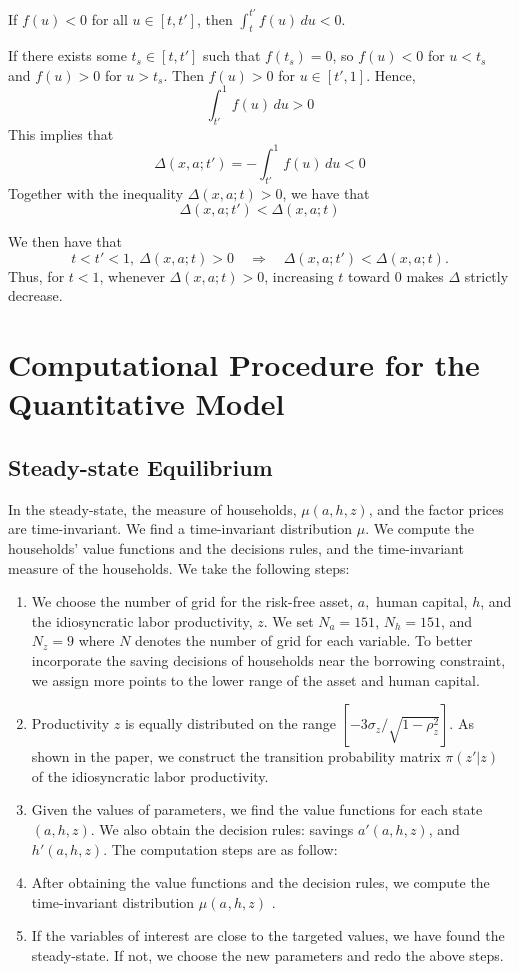 \documentclass[12pt]{article}
\begin{document}
If $f(u)<0$ for all $u\in[t,t']$, then $\int_{t}^{t'} f(u)\,du<0$.

If there exists some $t_s\in[t,t']$ such that $f(t_s)=0$, so $f(u)<0$ for $u<t_s$ and $f(u)>0$ for $u>t_s$. Then $f(u)>0$ for $u\in[t',1]$. Hence, 
\[
\int_{t'}^{1} f(u)\,du>0
\]
This implies that
\[\Delta(x,a;t')=-\int_{t'}^{1} f(u)\,du<0\]
Together with the inequality $\Delta(x,a;t)>0$, we have that
\[\Delta(x,a;t')<\Delta(x,a;t)\]

We then have that 
\begin{equation}
t<t'<1,\ \Delta(x,a;t)>0
\quad\Longrightarrow\quad
\Delta(x,a;t')<\Delta(x,a;t).
\end{equation}
Thus, for $t<1$, whenever $\Delta(x,a;t)>0$, increasing $t$ toward $0$ makes $\Delta$ strictly decrease.



\section{Computational Procedure for the Quantitative Model}

\subsection{Steady-state Equilibrium}

In the steady-state, the measure of households, $\mu(a,h,z)$, and
the factor prices are time-invariant. We find a time-invariant distribution
$\mu$. We compute the households' value functions and the decisions
rules, and the time-invariant measure of the households. We take the
following steps:
\begin{enumerate}
\item We choose the number of grid for the risk-free asset, $a,$ human
capital, $h$, and the idiosyncratic labor productivity, $z$. We
set $N_{a}=151$, $N_{h}=151$, and $N_{z}=9$ where $N$ denotes
the number of grid for each variable. To better incorporate the saving
decisions of households near the borrowing constraint, we assign more
points to the lower range of the asset and human capital. 
\item Productivity $z$ is equally distributed on the range $[-3\sigma_{z}/\sqrt{1-\rho_{z}^{2}}]$.
As shown in the paper, we construct the transition probability matrix
$\pi(z'|z)$ of the idiosyncratic labor productivity.
\item Given the values of parameters, we find the value functions for each
state $(a,h,z).$ We also obtain the decision rules: savings $a'(a,h,z)$,
and $h'(a,h,z)$. The computation steps are as follow:
\item After obtaining the value functions and the decision rules, we compute
the time-invariant distribution $\mu(a_{},h,z)$ .
\item If the variables of interest are close to the targeted values, we
have found the steady-state. If not, we choose the new parameters
and redo the above steps.
\end{enumerate}
\end{document}

